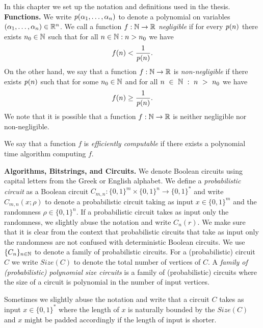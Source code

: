 %
In this chapter we set up the notation and definitions used in the thesis.
\textbf{Functions.}
We write $\operatorname{\mathit{p}}(\alpha_1, \dots, \alpha_n)$ to denote a polynomial on variables $(\alpha_1, \dots, \alpha_n) \in \mathbb{R}^n$.
We call a function $f: \mathbb{N} \rightarrow \mathbb{R}$ \textit{negligible} if for every $\operatorname{\mathit{p}}(n)$
there exists $n_0 \in \mathbb{N}$ such that for all $n \in \mathbb{N} : n > n_0$ we have
\begin{align*}
f(n) < \frac{1}{\operatorname{\mathit{p}}(n)}.
\end{align*}
On the other hand, we say that a function $f: \mathbb{N} \rightarrow \mathbb{R}$ is \textit{non-negligible} if
there exists $\operatorname{\mathit{p}}(n)$ such that for some $n_0 \in \mathbb{N}$ and for all $n~\in~\mathbb{N}~:~n~>~n_0$ we have
\begin{align*}
  f(n) \geq \frac{1}{\operatorname{\mathit{p}}(n)}.
\end{align*}
We note that it is possible that a function $f:\mathbb{N} \rightarrow \mathbb{R}$ is neither negligible nor non-negligible.

We say that a function $f$ is \textit{efficiently computable} if there exists a polynomial time algorithm computing $f$.

\textbf{Algorithms, Bitstrings, and Circuits.}
We denote Boolean circuits using capital letters from the Greek or English alphabet.
We define a \textit{probabilistic circuit} as a Boolean circuit $C_{m,n} : \{0,1\}^{m} \times \{0,1\}^{n} \rightarrow \{0,1\}^{*}$ and
write $C_{m,n}(x;\rho)$ to denote a probabilistic circuit taking as input $x \in \{0,1\}^{m}$ and the randomness $\rho \in \{0,1\}^{n}$.
If a probabilistic circuit takes as input only the randomness, we slightly abuse the notation and write $C_{n}(r)$.
We make sure that it is clear from the context that probabilistic circuits that take as input only the randomness
are not confused with deterministic Boolean circuits. We use $\{C_n\}_{n \in \mathbb{N}}$ to denote a family of probabilistic circuits.
For a (probabilistic) circuit $C$ we write $\mathit{Size}(C)$ to denote the total number of vertices of $C$.
A \textit{family of (probabilistic) polynomial size circuits} is a family of (probabilistic) circuits where
the size of a circuit is polynomial in the number of input vertices.

Sometimes we slightly abuse the notation and write that a circuit $C$ takes as input $x \in \{0,1\}^{*}$ where
the length of $x$ is naturally bounded by the $Size(C)$ and $x$ might be padded accordingly if the length of input is shorter.

